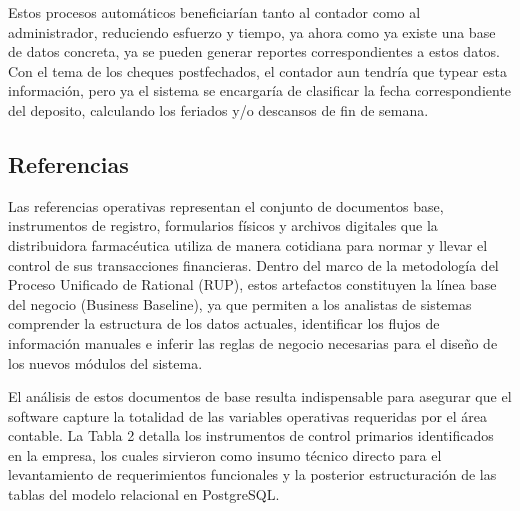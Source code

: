 Estos procesos automáticos beneficiarían tanto al contador como al administrador, reduciendo esfuerzo y tiempo, ya ahora como ya existe una base de datos concreta, ya se pueden generar reportes correspondientes a estos datos. Con el tema de los cheques postfechados, el contador aun tendría que typear esta información, pero ya el sistema se encargaría de clasificar la fecha correspondiente del deposito, calculando los feriados y/o descansos de fin de semana.


\subsection{Referencias}

Las referencias operativas representan el conjunto de documentos base, instrumentos de registro, formularios físicos y archivos digitales que la distribuidora farmacéutica utiliza de manera cotidiana para normar y llevar el control de sus transacciones financieras. Dentro del marco de la metodología del Proceso Unificado de Rational (RUP), estos artefactos constituyen la línea base del negocio (Business Baseline), ya que permiten a los analistas de sistemas comprender la estructura de los datos actuales, identificar los flujos de información manuales e inferir las reglas de negocio necesarias para el diseño de los nuevos módulos del sistema.

El análisis de estos documentos de base resulta indispensable para asegurar que el software capture la totalidad de las variables operativas requeridas por el área contable. La Tabla 2 detalla los instrumentos de control primarios identificados en la empresa, los cuales sirvieron como insumo técnico directo para el levantamiento de requerimientos funcionales y la posterior estructuración de las tablas del modelo relacional en PostgreSQL.

